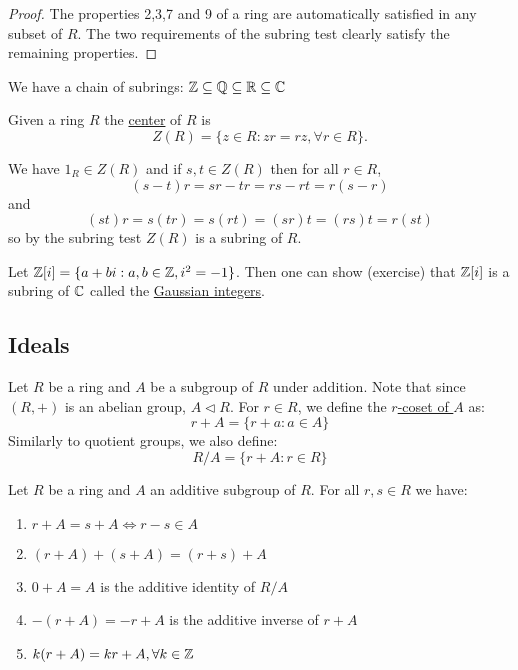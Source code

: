 \documentclass[11pt]{article}
\begin{document}
\begin{proof}
    The properties 2,3,7 and 9 of a ring are automatically satisfied in any subset of $R$. The two requirements of the subring test clearly satisfy the remaining properties.
\end{proof}

\begin{example}
    We have a chain of subrings: $\mathbb{Z}\subseteq\mathbb{Q}\subseteq\mathbb{R}\subseteq\mathbb{C}$
\end{example}

\begin{definition}
    Given a ring $R$ the \ul{center} of $R$ is
    \[Z(R)=\{z\in R:zr=rz,\forall r\in R\}.\]
\end{definition}

\begin{note}
    We have $1_R\in Z(R)$ and if $s,t\in Z(R)$ then for all $r\in R$,
    \[(s-t)r=sr-tr=rs-rt=r(s-r)\]
    and
    \[(st)r=s(tr)=s(rt)=(sr)t=(rs)t=r(st)\]
    so by the subring test $Z(R)$ is a subring of $R$.
\end{note}

\begin{example}
    Let $\mathbb{Z}[i]=\{a+bi:a,b\in\mathbb{Z},i^2=-1\}$. Then one can show (exercise) that $\mathbb{Z}[i]$ is a subring of $\mathbb{C}$ called the \ul{Gaussian integers}.
\end{example}

\subsection{Ideals}

\begin{definition}
    Let $R$ be a ring and $A$ be a subgroup of $R$ under addition. Note that since $(R,+)$ is an abelian group, $A\lhd R$. For $r\in R$, we define the \ul{$r$-coset of $A$} as:
    \[r+A=\{r+a:a\in A\}\]
    Similarly to quotient groups, we also define:
    \[R/A=\{r+A:r\in R\}\]
\end{definition}

\begin{theorem}
    Let $R$ be a ring and $A$ an additive subgroup of $R$. For all $r,s\in R$ we have:
    \begin{enumerate}
        \item $r+A=s+A\iff r-s\in A$
        \item $(r+A)+(s+A)=(r+s)+A$
        \item $0+A=A$ is the additive identity of $R/A$
        \item $-(r+A)=-r+A$ is the additive inverse of $r+A$
        \item $k(r+A)=kr+A,\forall k\in \mathbb{Z}$
    \end{enumerate}
\end{theorem}
\end{document}
